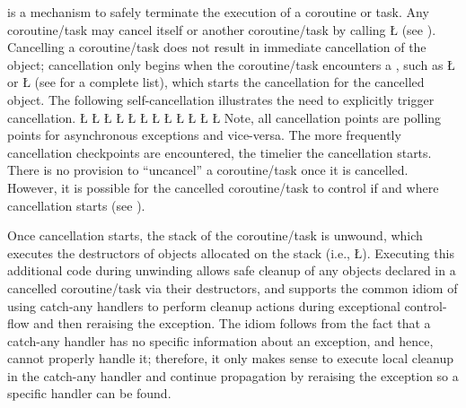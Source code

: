 \documentclass[openright,twoside]{report}
\newcommand{\BF}[1]{\Textbf{#1}}
\begin{document}
 is a mechanism to safely terminate the execution of a coroutine or task.
Any coroutine/task may cancel itself or another coroutine/task by calling \LGinlinetrue\LGbegin\lgrinde\L{}\endlgrinde\LGend{} (see ).
Cancelling a coroutine/task does not result in immediate cancellation of the object;
cancellation only begins when the coroutine/task encounters a , such as \LGinlinetrue\LGbegin\lgrinde\L{}\endlgrinde\LGend{} or \LGinlinetrue\LGbegin\lgrinde\L{}\endlgrinde\LGend{} (see  for a complete list), which starts the cancellation for the cancelled object.
The following self-cancellation illustrates the need to explicitly trigger cancellation.
\LGinlinefalse\LGbegin\lgrinde
\L{}
\L{\LB{}}
\L{\LB{}\Tab{8}{\BF{\V{cancel}();}}}
\CE{}\L{\LB{}\Tab{8}{\BF{\V{asyncpoll}();}}}
\CE{}\L{\LB{}}
\CE{}\L{\LB{}}
\L{}
\L{\LB{}}
\L{\LB{}}
\L{\LB{}}
\CE{}\L{\LB{}}
\L{\LB{\};}}
\endlgrinde\LGend
Note, all cancellation points are polling points for asynchronous exceptions and vice-versa.
The more frequently cancellation checkpoints are encountered, the timelier the cancellation starts.
There is no provision to ``uncancel'' a coroutine/task once it is cancelled.
However, it is possible for the cancelled coroutine/task to control if and where cancellation starts (see ).

Once cancellation starts, the stack of the coroutine/task is unwound, which executes the destructors of objects allocated on the stack  (i.e., \LGinlinetrue\LGbegin\lgrinde\L{}\endlgrinde\LGend{}).
Executing this additional code during unwinding allows safe cleanup of any objects declared in a cancelled coroutine/task via their destructors, and supports the common \CC idiom of using catch-any handlers to perform cleanup actions during exceptional control-flow and then reraising the exception.
The \CC idiom follows from the fact that a catch-any handler has no specific information about an exception, and hence, cannot properly handle it;
therefore, it only makes sense to execute local cleanup in the catch-any handler and continue propagation by reraising the exception so a specific handler can be found.
\end{document}
